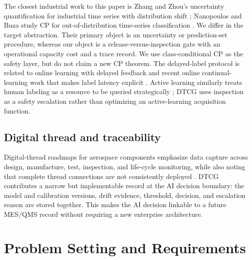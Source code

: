 \documentclass[journal]{IEEEtran}
\begin{document}
The closest industrial work to this paper is Zhang and Zhou's uncertainty quantification for industrial time series with distribution shift \cite{zhang2025}; Nanopoulos and Buza study CP for out-of-distribution time-series classification \cite{nanopoulos2025}. We differ in the target abstraction. Their primary object is an uncertainty or prediction-set procedure, whereas our object is a release-versus-inspection gate with an operational capacity cost and a trace record. We use class-conditional CP as the safety layer, but do not claim a new CP theorem. The delayed-label protocol is related to online learning with delayed feedback \cite{joulani2016} and recent online continual-learning work that makes label latency explicit \cite{botos2024}. Active learning similarly treats human labeling as a resource to be queried strategically \cite{settles2009}; DTCG uses inspection as a safety escalation rather than optimizing an active-learning acquisition function.

\subsection{Digital thread and traceability}
Digital-thread roadmaps for aerospace components emphasize data capture across design, manufacture, test, inspection, and life-cycle monitoring, while also noting that complete thread connections are not consistently deployed \cite{eskue2023}. DTCG contributes a narrow but implementable record at the AI decision boundary: the model and calibration versions, drift evidence, threshold, decision, and escalation reason are stored together. This makes the AI decision linkable to a future MES/QMS record without requiring a new enterprise architecture.

\section{Problem Setting and Requirements}
\label{sec:setting}
\end{document}

